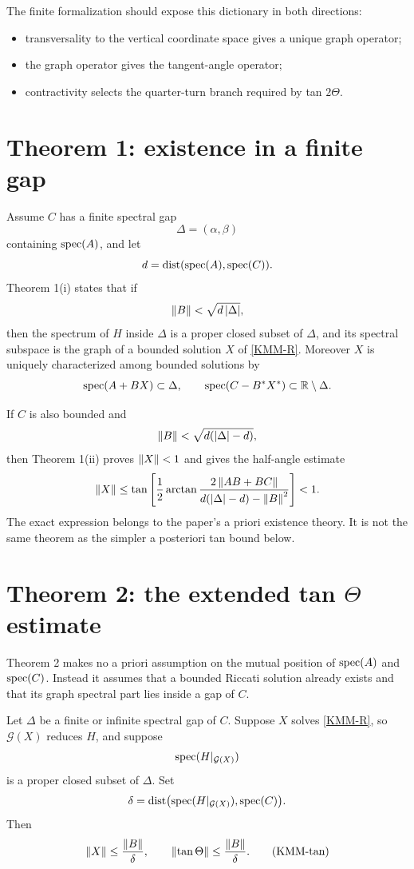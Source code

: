 The finite formalization should expose this dictionary in both directions:
\begin{itemize}[leftmargin=2em]
\item transversality to the vertical coordinate space gives a unique graph operator;
\item the graph operator gives the tangent-angle operator;
\item contractivity selects the quarter-turn branch required by tan $2\Theta$.
\end{itemize}

\section{Theorem 1: existence in a finite gap}

Assume $C$ has a finite spectral gap
\[
 \Delta=(\alpha,\beta)
\]
containing $\operatorname{spec}(A)$, and let
\[
 d=\operatorname{dist}(\operatorname{spec}(A),\operatorname{spec}(C)).
\]
Theorem 1(i) states that if
\[
 \left\lVert B\right\rVert<\sqrt{d\left\lvert \Delta\right\rvert},
\]
then the spectrum of $H$ inside $\Delta$ is a proper closed subset of $\Delta$, and its spectral subspace is the graph of a bounded solution $X$ of \eqref{KMM-R}. Moreover $X$ is uniquely characterized among bounded solutions by
\[
 \operatorname{spec}(A+BX)\subset\Delta,
 \qquad
 \operatorname{spec}(C-B^*X^*)\subset\mathbb{R}\setminus\Delta.
\]

If $C$ is also bounded and
\[
 \left\lVert B\right\rVert<\sqrt{d(\left\lvert \Delta\right\rvert-d)},
\]
then Theorem 1(ii) proves $\left\lVert X\right\rVert<1$ and gives the half-angle estimate
\[
 \left\lVert X\right\rVert
 \le
 \tan\left[
  \frac12\arctan
  \frac{2\left\lVert AB+BC\right\rVert}
       {d(\left\lvert \Delta\right\rvert-d)-\left\lVert B\right\rVert^2}
 \right]
 <1.
\]
The exact expression belongs to the paper's a priori existence theory. It is not the same theorem as the simpler a posteriori tan bound below.

\section{Theorem 2: the extended tan $\Theta$ estimate}

Theorem 2 makes no a priori assumption on the mutual position of $\operatorname{spec}(A)$ and $\operatorname{spec}(C)$. Instead it assumes that a bounded Riccati solution already exists and that its graph spectral part lies inside a gap of $C$.

Let $\Delta$ be a finite or infinite spectral gap of $C$. Suppose $X$ solves \eqref{KMM-R}, so $\mathcal G(X)$ reduces $H$, and suppose
\[
 \operatorname{spec}(H|_{\mathcal G(X)})
\]
is a proper closed subset of $\Delta$. Set
\[
 \delta
 =\operatorname{dist}\bigl(\operatorname{spec}(H|_{\mathcal G(X)}),\operatorname{spec}(C)\bigr).
\]
Then
\begin{equation}
 \left\lVert X\right\rVert\le\frac{\left\lVert B\right\rVert}{\delta},
 \qquad
 \left\lVert \tan\Theta\right\rVert\le\frac{\left\lVert B\right\rVert}{\delta}.
 \tag{KMM-tan}\label{KMM-tan}
\end{equation}

